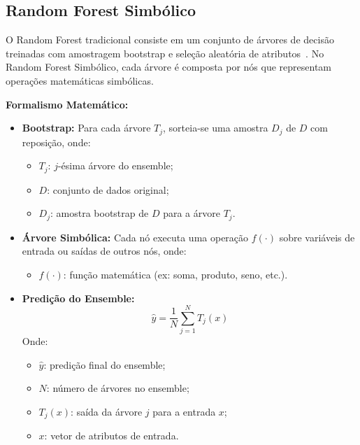 \documentclass[11pt]{article}
\begin{document}
\subsection{Random Forest Simbólico}
O Random Forest tradicional consiste em um conjunto de árvores de decisão treinadas com amostragem bootstrap e seleção aleatória de atributos~\cite{pedregosa2011scikit}. No Random Forest Simbólico, cada árvore é composta por nós que representam operações matemáticas simbólicas.

\textbf{Formalismo Matemático:}
\begin{itemize}
    \item \textbf{Bootstrap:} Para cada árvore $T_j$, sorteia-se uma amostra $D_j$ de $D$ com reposição, onde:
    \begin{itemize}
        \item $T_j$: $j$-ésima árvore do ensemble;
        \item $D$: conjunto de dados original;
        \item $D_j$: amostra bootstrap de $D$ para a árvore $T_j$.
    \end{itemize}
    \item \textbf{Árvore Simbólica:} Cada nó executa uma operação $f(\cdot)$ sobre variáveis de entrada ou saídas de outros nós, onde:
    \begin{itemize}
        \item $f(\cdot)$: função matemática (ex: soma, produto, seno, etc.).
    \end{itemize}
    \item \textbf{Predição do Ensemble:}
    \[
    \hat{y} = \frac{1}{N} \sum_{j=1}^N T_j(x)
    \]
    Onde:
    \begin{itemize}
        \item $\hat{y}$: predição final do ensemble;
        \item $N$: número de árvores no ensemble;
        \item $T_j(x)$: saída da árvore $j$ para a entrada $x$;
        \item $x$: vetor de atributos de entrada.
    \end{itemize}
\end{itemize}
\end{document}
